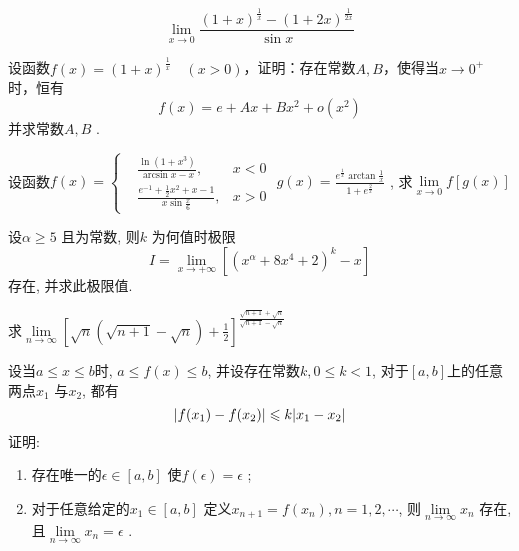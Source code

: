 \begin{question}
    \begin{equation*}
        \lim\limits_{x \to 0} \frac{ ( 1 + x )^{ \frac{1}{x} } -( 1 + 2x )^{ \frac{1}{2x} } }{ \sin x }
    \end{equation*}
\end{question}
\begin{question}
    设函数$ f(x) = (1 + x)^{\frac{1}{x}} \quad (x > 0) $，证明：存在常数$ A, B $，使得当$ x \to 0^+ $时，恒有
    \begin{equation*}
        f(x) = e + Ax +Bx^2 + o(x^2)
    \end{equation*}   
    并求常数$ A, B $ .
\end{question}
\begin{question}
    设函数$ f(x) = \left\{
        \begin{aligned}
            &\frac{ \ln(1 + x^3) }{ \arcsin x - x }, & x < 0   \\
            &\frac{ e^{-1} + \frac{1}{2} x^2 + x -1 }{ x \sin \frac{x}{6} }, & x > 0
        \end{aligned}  
    \right. $ 
    $ g(x) = \frac{ e^{\frac{1}{x}} \arctan \frac{1}{x} }{ 1 + e^{\frac{2}{x}} } $ , 求$ \lim\limits_{x \to 0} f [ g( x ) ] $ 
\end{question}
\begin{question}
    设$ \alpha \ge 5 $ 且为常数, 则$ k $ 为何值时极限
    \begin{equation*}
        I = \lim\limits_{x \to + \infty} [( x^\alpha + 8x^4 +2 )^k - x]
    \end{equation*}
    存在, 并求此极限值.
\end{question}
\begin{question}
    求$ \lim\limits_{n \to \infty} [ \sqrt{n} ( \sqrt{ n + 1 } - \sqrt{n} ) + \frac{1}{2} ]^{\frac{ \sqrt{ n + 1 } + \sqrt{n} }{ \sqrt{ n + 1 } -\sqrt{n} }} $ 
\end{question}
\begin{question}
    设当$ a \le x \le b $时, $ a \le f(x) \le b $, 并设存在常数$ k, 0 \le k < 1 $, 对于$ [a, b] $上的任意两点$ x_1 $ 与$ x_2 $, 都有
    \begin{equation*}
        \lvert f(x_1) - f(x_2) \rvert \leqslant k \lvert x_1 - x_2 \rvert
    \end{equation*}
    证明:
    \begin{enumerate}
        \item 存在唯一的$ \epsilon \in [a, b] $ 使$ f(\epsilon) = \epsilon $ ;
        \item 对于任意给定的$ x_1 \in [a, b] $ 定义$ x_{n + 1} = f(x_n), n = 1,2,\cdots $, 则$ \lim\limits_{n \to \infty} x_n $ 存在, 且$ \lim\limits_{n \to \infty} x_n = \epsilon $ . 
    \end{enumerate}      
\end{question}